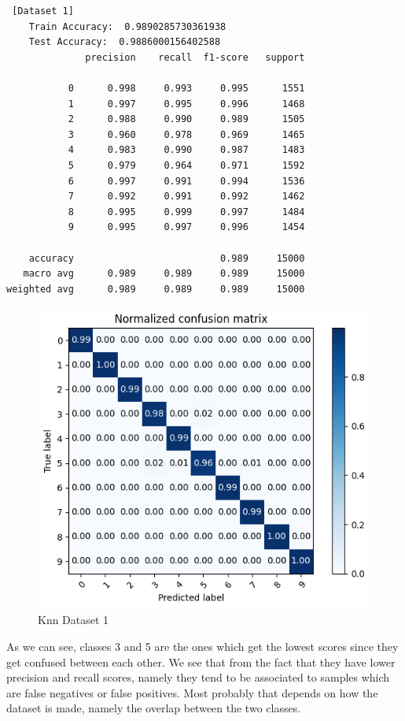\documentclass[12pt,a4paper,oneside]{article}
\begin{document}
\begin{verbatim} [Dataset 1]
    Train Accuracy:  0.9890285730361938
    Test Accuracy:  0.9886000156402588
              precision    recall  f1-score   support

           0      0.998     0.993     0.995      1551
           1      0.997     0.995     0.996      1468
           2      0.988     0.990     0.989      1505
           3      0.960     0.978     0.969      1465
           4      0.983     0.990     0.987      1483
           5      0.979     0.964     0.971      1592
           6      0.997     0.991     0.994      1536
           7      0.992     0.991     0.992      1462
           8      0.995     0.999     0.997      1484
           9      0.995     0.997     0.996      1454

    accuracy                          0.989     15000
   macro avg      0.989     0.989     0.989     15000
weighted avg      0.989     0.989     0.989     15000
\end{verbatim}

\begin{figure}[H]
    \includegraphics{figures/knn_plain_cm.png}
    \caption{Knn Dataset 1}
\end{figure}

As we can see, classes 3 and 5 are the ones which get the lowest scores since
they get confused between each other. We see that from the fact that they have
lower precision and recall scores, namely they tend to be associated to samples
which are false negatives or false positives. Most probably that depends on how
the dataset is made, namely the overlap between the two classes.
\end{document}
